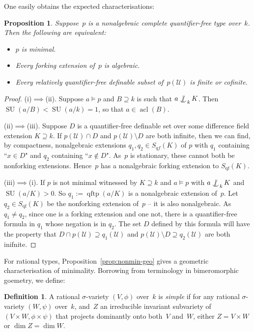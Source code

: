 \documentclass[\DocOpts]{amsart}
\newtheorem{proposition}[theorem]{Proposition}
\theoremstyle{definition}
\newtheorem{definition}[theorem]{Definition}
\def\qftp{\operatorname{qftp}}
\def\qf{\operatorname{qf}}
\def\acl{\operatorname{acl}}
\def\su{\operatorname{SU}}
\def\U{\mathcal{U}}
\newcommand{\<}{\langle}
\renewcommand{\>}{\rangle}
\def\notind#1#2{#1\setbox0=\hbox{\(#1x\)}\kern\wd0\hbox to 
0pt{\mathchardef\nn=12854\hss\(#1\nn\)\kern1.4\wd0\hss}\hbox to 
0pt{\hss\(#1\mid\)\hss}\lower.9\ht0 \hbox to 
0pt{\hss\(#1\smile\)\hss}\kern\wd0}
\def\nind{\mathop{\mathpalette\notind{}}}
\begin{document}
One easily  obtains the expected characterisations:

\begin{proposition}
\label{prop:min-equiv}
Suppose~\(p\) is a nonalgebraic complete quantifier-free type over~$k$.
Then the following are equivalent:
\begin{itemize}
\item[(i)]
$p$ is minimal.
\item[(ii)]
Every forking extension of~$p$ is algebraic.
\item[(iii)]
Every relatively quantifier-free definable subset of~$p(\U)$ is finite or cofinite.
 \end{itemize}
\end{proposition}

\begin{proof}
(i)$\implies$(ii).
Suppose $a\models p$ and $B\supseteq k$ is such that $a\nind_kK$.
Then $\su(a/B)<\su(a/k)=1$, so that $a\in\acl(B)$. 

(ii)$\implies$(iii).
Suppose $D$ is a quantifier-free definable set over some difference field 
extension $K\supseteq k$.
If $p(\U)\cap D$ and $p(\U)\setminus D$ are both infinite, then we can find, by compactness, nonalgebraic extensions $q_1,q_2\in S_{qf}(K)$ of $p$ with $q_1$ containing ``$x\in D$" and $q_2$ containing ``$x\notin D$".
As~$p$ is stationary, these cannot both be nonforking extensions.
Hence~$p$ has a nonalgebraic forking extension to $S_{\qf}(K)$.

(iii)$\implies$(i).
If $p$ is not minimal witnessed by $K\supseteq k$ and $a\models p$ with $a\nind_kK$ and $\su(a/K)>0$.
So $q_1:=\qftp(a/K)$ is a nonalgebraic extension of~$p$.
Let $q_2\in S_{\qf}(K)$ be the nonforking extension of~$p$ -- it is also nonalgebraic.
As $q_1\neq q_2$, since one is a forking extension and one not, there is a quantifier-free formula in $q_1$ whose negation is in $q_2$.
The set $D$ defined by this formula will have the property that $D\cap p(\U)\supseteq q_1(\U)$ and $p(\U)\setminus D\supseteq q_2(\U)$ are both inifnite.
\end{proof}

For rational types, Proposition~\ref{prop:nonmin-geo} gives a geometric characterisation of minimality.
Borrowing from terminology in bimeromorphic goemetry, we define:

\begin{definition}
\label{def:simple}
A rational $\sigma$-variety $(V,\phi)$ over~$k$ is {\em simple} if for any rational $\sigma$-variety  $(W,\psi)$ over~$k$, and~$Z$ an irreducible invariant subvariety of $(V\times W,\phi\times\psi)$ that projects dominantly onto both~$V$ and~$W$, either $Z=V\times W$ or  $\dim Z=\dim W$.
\end{definition}
\end{document}
